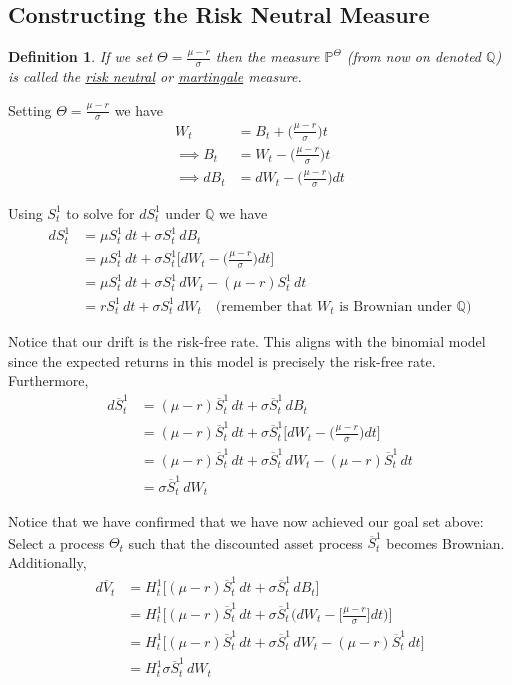 \documentclass[12pt]{article}
\newtheorem{definition}{Definition}
\newlength\tindent
\renewcommand{\indent}{\hspace*{\tindent}}
\begin{document}
\subsection{Constructing the Risk Neutral Measure}

\begin{definition} If we set $\Theta = \frac{\mu - r}{\sigma}$ then the measure $\mathbb P^\Theta$ (from now on denoted $\mathbb Q$) is called the \underline{risk neutral} or \underline{martingale} measure.
\end{definition}

Setting $\Theta = \frac{\mu - r}{\sigma}$ we have
\begin{align*}
	W_t &= B_t + \Big(\frac{\mu - r}{\sigma}\Big)t \\
	\implies B_t &= W_t - \Big(\frac{\mu - r}{\sigma}\Big)t \\
	\implies dB_t &= dW_t - \Big(\frac{\mu - r}{\sigma}\Big)dt
\end{align*}

Using $S^1_t$ to solve for $dS^1_t$ under $\mathbb Q$ we have
\begin{align*}
	dS^1_t &= \mu S^1_t\,dt + \sigma S^1_t\,dB_t \\
	&= \mu S^1_t\,dt + \sigma S^1_t\Big[dW_t - \Big(\frac{\mu - r}{\sigma}\Big)dt\Big] \\
	&= \mu S^1_t\,dt + \sigma S^1_t\,dW_t - (\mu - r)S^1_t\,dt \\
	&= rS^1_t\,dt + \sigma S^1_t\,dW_t \quad \text{(remember that $W_t$ is Brownian under $\mathbb Q$)}
\end{align*}

\indent Notice that our drift is the risk-free rate. This aligns with the binomial model since the expected returns in this model is precisely the risk-free rate. Furthermore,
\begin{align*}
	d\overline{S}^1_t &= (\mu - r)\overline{S}^1_t\,dt + \sigma\overline{S}^1_t\,dB_t \\
	&= (\mu - r)\overline{S}^1_t\,dt + \sigma\overline{S}^1_t\Big[dW_t - \Big(\frac{\mu - r}{\sigma}\Big)dt\Big] \\
	&= (\mu - r)\overline{S}^1_t\,dt + \sigma\overline{S}^1_t\,dW_t - (\mu - r)\overline{S}^1_t\,dt \\
	&= \sigma\overline{S}^1_t\,dW_t
\end{align*}

\indent Notice that we have confirmed that we have now achieved our goal set above: Select a process $\Theta_t$ such that the discounted asset process $\overline{S}^1_t$ becomes Brownian. Additionally,
\begin{align*}
	d\overline{V}_t &= H^1_t\big[(\mu - r)\overline{S}^1_t\,dt + \sigma\overline{S}^1_t\,dB_t\big] \\
	&= H^1_t\big[(\mu - r)\overline{S}^1_t\,dt + \sigma\overline{S}^1_t\big( dW_t - \Big[\frac{\mu - r}{\sigma}\Big]dt \big)\big] \\
	&= H^1_t\big[(\mu - r)\overline{S}^1_t\,dt + \sigma\overline{S}^1_t\,dW_t - (\mu - r)\overline{S}^1_t\,dt\big] \\
	&= H^1_t\sigma\overline{S}^1_t\,dW_t
\end{align*}
\end{document}
